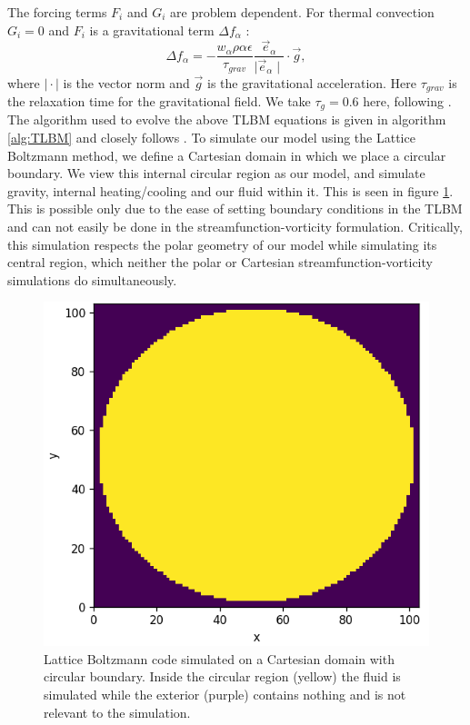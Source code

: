 \documentclass{article}
\begin{document}
\noindent The forcing terms $F_i$ and $G_i$ are problem dependent. For thermal convection 
$G_i=0$ and $F_i$ is a gravitational term ${\Delta f}_{\alpha}$ \cite{mora2017simulation}:
\begin{equation}
	{\Delta f}_{\alpha} = - 
	\frac{w_{\alpha} \rho \alpha \epsilon}{\tau_{grav}}
	 \frac{\vec{e}_{\alpha}}{\mid \vec{e}_{\alpha} \mid} \cdot \vec{g} ,
\end{equation}
\noindent where $\mid \cdot \mid$ is the vector norm and $\vec{g}$ is the gravitational 
acceleration. Here $\tau_{grav}$ is the relaxation time for the gravitational field. We 
take $\tau_g=0.6$ here, following \cite{mora2017simulation}. The algorithm used to evolve 
the above TLBM equations is given in algorithm \ref{alg:TLBM} and closely follows 
\cite{mora2017simulation}.
\newline
\noindent To simulate our model using the Lattice Boltzmann method, we define a Cartesian domain in which we place a circular boundary. We view this internal circular region as our model, and simulate gravity, internal heating/cooling and our fluid within it. This is seen in figure \ref{TLBM model}. This is possible only due to the ease of setting boundary conditions in the TLBM and can not easily be done in the streamfunction-vorticity formulation.
Critically, this simulation respects the polar geometry of our model while simulating its central region, which neither the polar or Cartesian streamfunction-vorticity simulations do simultaneously.

\begin{figure}[H]
	\centering
	\includegraphics{latticeBoltzmanModel.png}
	\caption{Lattice Boltzmann code simulated on a Cartesian domain with circular boundary. Inside the circular region (yellow) the fluid is simulated while the exterior (purple) contains nothing and is not relevant to the simulation.}
	\label{TLBM model}
\end{figure}
\end{document}
